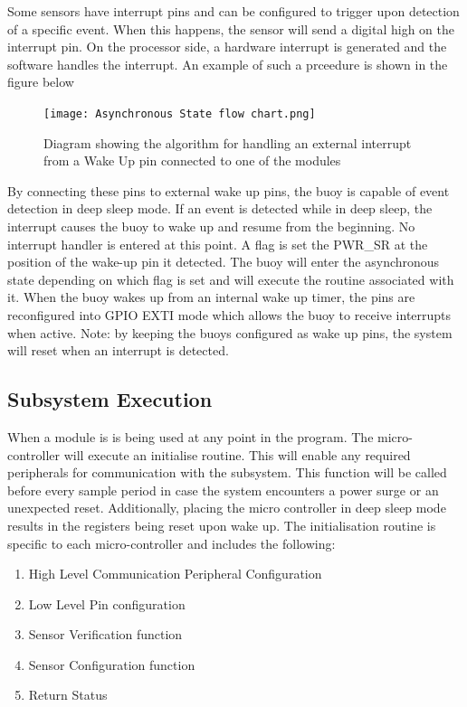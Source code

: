 Some sensors have interrupt pins and can be configured to trigger upon detection of a specific event. When this happens, the sensor will send a digital high on the interrupt pin. On the processor side, a hardware interrupt is generated and the software handles the interrupt. An example of such a prceedure is shown in the figure below

\begin{figure}[H]
	\centering
	\texttt{[image: Asynchronous State flow chart.png]}
	\caption{Diagram showing the algorithm for handling an external interrupt from a Wake Up pin connected to one of the modules}
	\label{fig:int_handle}
\end{figure}

By connecting these pins to external wake up pins, the buoy is capable of event detection in deep sleep mode. If an event is detected while in deep sleep, the interrupt causes the buoy to wake up and resume from the beginning. No interrupt handler is entered at this point. A flag is set the PWR\_SR at the position of the wake-up pin it detected. The buoy will enter the asynchronous state depending on which flag is set and will execute the routine associated with it.  When the buoy wakes up from an internal wake up timer, the pins are reconfigured into GPIO EXTI mode which allows the buoy to receive interrupts when active. Note: by keeping the buoys configured as wake up pins, the system will reset when an interrupt is detected.

\subsection{Subsystem Execution}

When a module is is being used at any point in the program. The micro-controller will execute an initialise routine. This will enable any required peripherals for communication with the subsystem. This function will be called before every sample period in case the system encounters a power surge or an unexpected reset. Additionally, placing the micro controller in deep sleep mode results in the registers being reset upon wake up. The initialisation routine is specific to each micro-controller and includes the following:

\begin{enumerate}
	\item High Level Communication Peripheral Configuration
	\item Low Level Pin configuration
	\item Sensor Verification function
	\item Sensor Configuration function
	\item Return Status
\end{enumerate}

